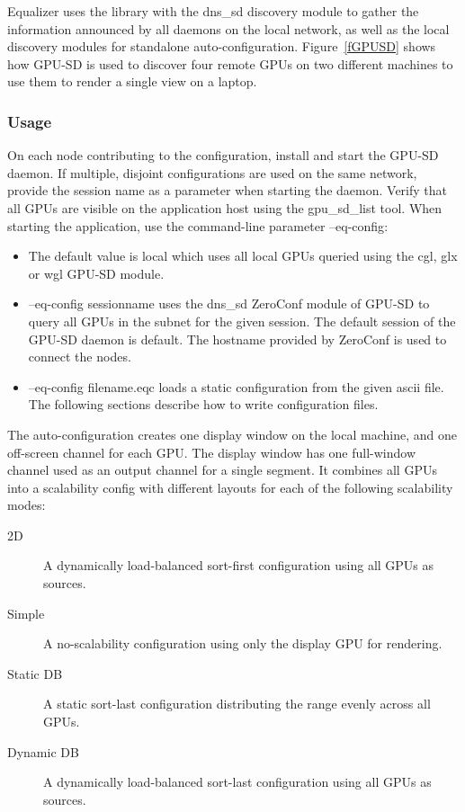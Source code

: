 \documentclass[10pt,a4]{scrartcl}
\newcommand{\fig}[1]{Figure~\ref{#1}}
\begin{document}
Equalizer uses the library with the dns\_sd discovery module to gather the
information announced by all daemons on the local network, as well as the local
discovery modules for standalone auto-configuration. \fig{fGPUSD} shows how
GPU-SD is used to discover four remote GPUs on two different machines to use
them to render a single view on a laptop.

\subsubsection{\label{sGPUSDUsage}Usage}

On each node contributing to the configuration, install and start the GPU-SD
daemon. If multiple, disjoint configurations are used on the same network,
provide the session name as a parameter when starting the daemon. Verify that
all GPUs are visible on the application host using the \textsf{gpu\_sd\_list}
tool. When starting the application, use the command-line parameter
\textsf{--eq-config}:

\begin{itemize}
\item The default value is \textsf{local} which uses all local GPUs queried
  using the cgl, glx or wgl GPU-SD module.
\item \textsf{--eq-config sessionname} uses the dns\_sd ZeroConf module of
  GPU-SD to query all GPUs in the subnet for the given session. The default
  session of the GPU-SD daemon is \textsf{default}. The hostname provided by
  ZeroConf is used to connect the nodes.
\item \textsf{--eq-config filename.eqc} loads a static configuration from the
  given ascii file. The following sections describe how to write configuration
  files.
\end{itemize}

The auto-configuration creates one display window on the local machine, and one
off-screen channel for each GPU. The display window has one full-window channel
used as an output channel for a single segment. It combines all GPUs into a
scalability config with different layouts for each of the following scalability
modes:

\begin{description}
\item [2D] A dynamically load-balanced sort-first configuration using all GPUs
  as sources.
\item [Simple] A no-scalability configuration using only the display GPU for
  rendering.
\item [Static DB] A static sort-last configuration distributing the range evenly
  across all GPUs.
\item [Dynamic DB] A dynamically load-balanced sort-last configuration using all
  GPUs as sources.
\end{description}
\end{document}
